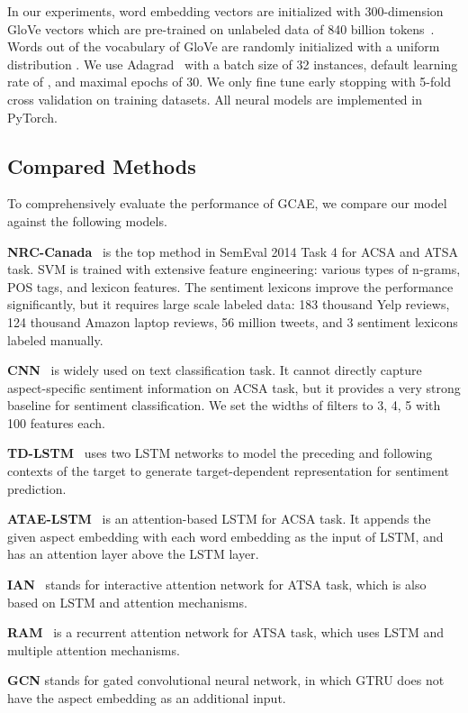 \documentclass[11pt,a4paper]{article}
\begin{document}
In our experiments, word embedding vectors are initialized with 300-dimension GloVe vectors which are pre-trained on unlabeled data of 840 billion tokens~\cite{Pennington:2014uw}. Words out of the vocabulary of GloVe are randomly initialized with a uniform distribution .
We use Adagrad~\cite{Duchi:2011wu} with a batch size of 32 instances, default learning rate of , and maximal epochs of 30. We only fine tune early stopping with 5-fold cross validation on training datasets. All neural models are implemented in PyTorch.

\subsection{Compared Methods}
To comprehensively evaluate the performance of GCAE, we compare our model against the following models. 

\textbf{NRC-Canada}~\cite{Kiritchenko:2014jw} is the top method in SemEval 2014 Task 4 for ACSA and ATSA task. SVM is trained with extensive feature engineering: various types of n-grams, POS tags, and lexicon features. The sentiment lexicons improve the performance significantly, but it requires large scale labeled data: 183 thousand Yelp reviews, 124 thousand Amazon laptop reviews, 56 million tweets, and 3 sentiment lexicons labeled manually.

\textbf{CNN}~\cite{Kim:2014vt} is widely used on text classification task. It cannot directly capture aspect-specific sentiment information on ACSA task, but it provides a very strong baseline for sentiment classification. We set the widths of filters to 3, 4, 5 with 100 features each.

\textbf{TD-LSTM}~\cite{Tang:2016th} uses two LSTM networks to model the preceding and following contexts of the target to generate target-dependent representation for sentiment prediction.

\textbf{ATAE-LSTM}~\cite{Wang:2016tf} is an attention-based LSTM for ACSA task. It appends the given aspect embedding with each word embedding as the input of LSTM, and has an attention layer above the LSTM layer. 

\textbf{IAN}~\cite{Ma:2017jo} stands for interactive attention network for ATSA task, which is also based on LSTM and attention mechanisms. 

\textbf{RAM}~\cite{Chen:2017wv} is a recurrent attention network for ATSA task, which uses LSTM and multiple attention mechanisms.

\textbf{GCN} stands for gated convolutional neural network, in which GTRU does not have the aspect embedding as an additional input.
\end{document}

